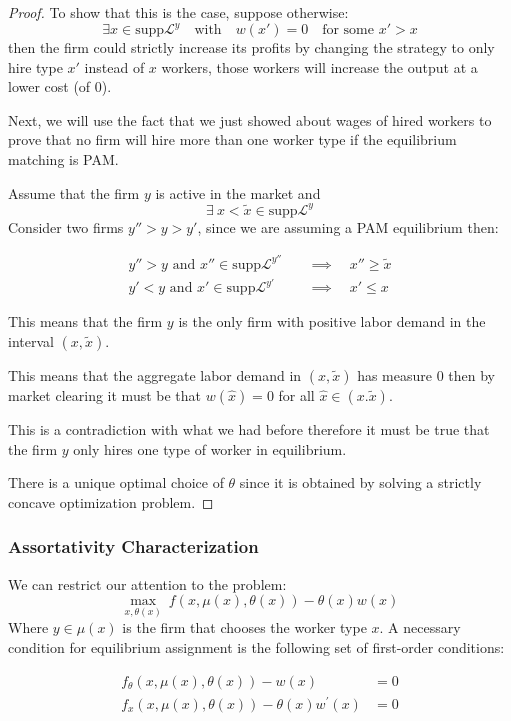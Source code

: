 \documentclass[12pt]{article}
\theoremstyle{definition}
\begin{document}
\begin{proof}
To show that this is the case, suppose otherwise: $$\exists x\in \text{supp} \mathcal{L}^y \quad \text{with} \quad w(x')=0 \quad \text{for some }x'>x$$ then the firm could strictly increase its profits by changing the strategy to only hire type $x'$ instead of $x$ workers, those workers will increase the output at a lower cost (of $0$).


Next, we will use the fact that we just showed about wages of hired workers to prove that no firm will hire more than one worker type if the equilibrium matching is PAM.

Assume that the firm $y$ is active in the market and $$\exists\: x < \tilde{x} \in \text{supp}\mathcal{L}^y$$
Consider two firms $y''>y>y'$, since we are assuming a PAM equilibrium then:

\begin{align*}
y''>y \text{ and } x''\in\text{supp}\mathcal{L}^{y''} \quad &\implies \quad x''\geq \tilde{x}\\
y'<y \text{ and } x'\in\text{supp}\mathcal{L}^{y'} \quad &\implies \quad x'\leq x
\end{align*}


This means that the firm $y$ is the only firm with positive labor demand in the interval $(x,\tilde{x})$.

This means that the aggregate labor demand in $(x,\tilde{x})$ has measure $0$ then by market clearing it must be that $w(\hat{x})=0$ for all $\hat{x}\in(x.\tilde{x})$.

This is a contradiction with what we had before therefore it must be true that the firm $y$ only hires one type of worker in equilibrium.

There is a unique optimal choice of $\theta$ since it is obtained by solving a strictly concave optimization problem.

\end{proof}

\subsubsection{Assortativity Characterization}

We can restrict our attention to the problem: $$\max_{x,\theta(x)}\:  f(x, \mu(x), \theta(x))-\theta(x) w(x)$$
Where $y\in\mu(x)$ is the firm that chooses the worker type $x$. A necessary condition for equilibrium assignment is the following set of first-order conditions:

\begin{subequations}
\label{foc}
\begin{align}
f_{\theta}(x, \mu(x), \theta(x))-w(x) &=0 \label{foc1}\\
f_{x}(x, \mu(x), \theta(x))-\theta(x) w^{\prime}(x) &=0 \label{foc2}
\end{align}
\end{subequations}
\end{document}
